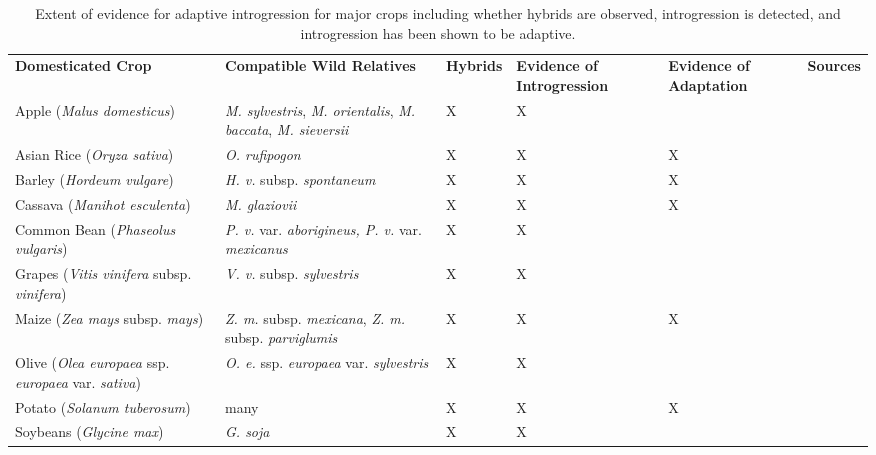 \documentclass[11pt]{article}
\begin{document}
{\begin{table}[h]
\begin{center}
\begin{tabular}{G{2.8cm}G{3.5cm}G{4cm}G{4cm}}
\end{tabular}
\end{center}
\end{table} 

\hspace*{-1.5cm}
\begin{table}
\caption{\small Extent of evidence for adaptive introgression for major crops including whether hybrids are observed, introgression is detected, and introgression has been shown to be adaptive.} \label{tab:intro}
        \small
    \begin{tabular}{G{4.5cm}G{5.5cm}C{1.75cm}C{2.5cm}C{2.25cm}G{3.5cm}}
    \\\toprule  
    {\bf Domesticated Crop}	& {\bf Compatible Wild Relatives} &	{\bf Hybrids} &  {\bf Evidence of Introgression } &	{\bf Evidence of Adaptation} & {\bf Sources}\\ \midrule
Apple (\emph{Malus domesticus}) & \emph{M. sylvestris}, \emph{M. orientalis}, \emph{M. baccata}, \emph{M. sieversii}  & X & X & & \cite{ma2017reduced} \\
Asian Rice (\emph{Oryza sativa}) & \emph{O. rufipogon} & X & X & X & \cite{Huang2012} \\ 
Barley (\emph{Hordeum vulgare}) & \emph{H. v.} subsp. \emph{spontaneum} & X & X & X & \cite{Poets2015} \\
Cassava (\emph{Manihot esculenta}) & \emph{M. glaziovii} & X & X & X & \cite{bredeson2016sequencing} \\
Common Bean (\emph{Phaseolus vulgaris}) & \emph{P. v.} var. \emph{aborigineus, P. v.} var. \emph{mexicanus} & X & X &  & \cite{rendon2017genomic} \\
Grapes (\emph{Vitis vinifera} subsp. \emph{vinifera}) & \emph{V. v.} subsp. \emph{sylvestris} & X & X &  &  \cite{myles2011genetic} \\
Maize (\emph{Zea mays} subsp. \emph{mays}) & \emph{Z. m.} subsp. \emph{mexicana}, \emph{Z. m. } subsp. \emph{parviglumis} & X & X & X & \cite{Hufford2013} \\
Olive (\emph{Olea europaea} ssp. \emph{europaea} var. \emph{sativa}) & \emph{O. e.} ssp. \emph{europaea} var. \emph{sylvestris} & X & X & & \cite{diez2015olive} \\ 

Potato (\emph{Solanum tuberosum}) & many & X & X & X & \cite{hardigan2017genome}\\
Soybeans (\emph{Glycine max}) & \emph{G. soja} & X & X &  & \cite{han2016domestication} \\ 
 

\end{tabular}
\end{table}}
\end{document}
